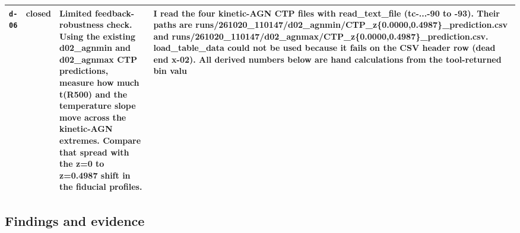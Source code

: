 \documentclass[11pt,a4paper]{article}
\begin{document}
\begin{longtable}{@{}p{}p{}p{}p{}@{}}
\texttt{d-06} & closed & Limited feedback-robustness check. Using the existing d02\_agnmin and d02\_agnmax CTP predictions, measure how much t(R500) and the temperature slope move across the kinetic-AGN extremes. Compare that spread with the z=0 to z=0.4987 shift in the fiducial profiles. & I read the four kinetic-AGN CTP files with read\_text\_file (tc-...-90 to -93). Their paths are runs/261020\_110147/d02\_agnmin/CTP\_z\{0.0000,0.4987\}\_prediction.csv and runs/261020\_110147/d02\_agnmax/CTP\_z\{0.0000,0.4987\}\_prediction.csv. load\_table\_data could not be used because it fails on the CSV header row (dead end x-02). All derived numbers below are hand calculations from the tool-returned bin valu \\
\bottomrule\end{longtable}
\subsection{Findings and evidence}
\end{document}
